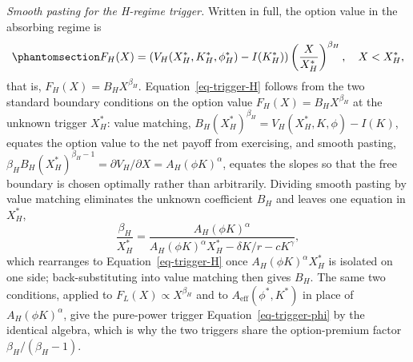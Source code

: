 \documentclass[
  11pt,
  letterpaper,
]{scrartcl}
\begin{document}
\emph{Smooth pasting for the H-regime trigger.} Written in full, the
option value in the absorbing regime is
\begin{equation}\protect\phantomsection\label{eq-option-H}{
F_H(X) = \left(V_H(X_H^*, K_H^*, \phi_H^*) - I(K_H^*)\right) \left(\frac{X}{X_H^*}\right)^{\beta_H}, \quad X < X_H^*,
}\end{equation} that is, \(F_H(X) = B_H X^{\beta_H}\).
Equation~\ref{eq-trigger-H} follows from the two standard boundary
conditions on the option value \(F_H(X) = B_H X^{\beta_H}\) at the
unknown trigger \(X_H^*\): value matching,
\(B_H (X_H^*)^{\beta_H} = V_H(X_H^*, K, \phi) - I(K)\), equates the
option value to the net payoff from exercising, and smooth pasting,
\(\beta_H B_H (X_H^*)^{\beta_H - 1} = \partial V_H/\partial X = A_H(\phi K)^\alpha\),
equates the slopes so that the free boundary is chosen optimally rather
than arbitrarily. Dividing smooth pasting by value matching eliminates
the unknown coefficient \(B_H\) and leaves one equation in \(X_H^*\), \[
\frac{\beta_H}{X_H^*} = \frac{A_H (\phi K)^\alpha}{A_H (\phi K)^\alpha X_H^* - \delta K/r - cK^\gamma},
\] which rearranges to Equation~\ref{eq-trigger-H} once
\(A_H (\phi K)^\alpha X_H^*\) is isolated on one side; back-substituting
into value matching then gives \(B_H\). The same two conditions, applied
to \(F_L(X) \propto X^{\beta_H}\) and to \(A_{\text{eff}}(\phi^*, K^*)\)
in place of \(A_H(\phi K)^\alpha\), give the pure-power trigger
Equation~\ref{eq-trigger-phi} by the identical algebra, which is why the
two triggers share the option-premium factor \(\beta_H/(\beta_H-1)\).
\end{document}
